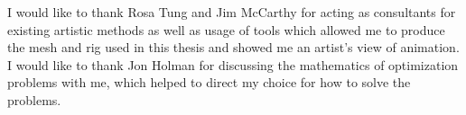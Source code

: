  
I would like to thank Rosa Tung and Jim McCarthy for acting as consultants for existing artistic methods as well as usage of tools which allowed me to produce the mesh and rig used in this thesis and showed me an artist's view of animation.  I would like to thank Jon Holman for discussing the mathematics of optimization problems with me, which helped to direct my choice for how to solve the problems.